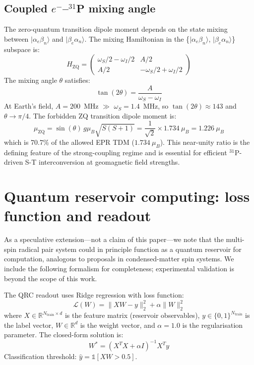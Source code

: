 \documentclass[11pt]{article}
\begin{document}
\subsection{Coupled $e^-$--$^{31}$P mixing angle}

The zero-quantum transition dipole moment depends on the state mixing between $|\alpha_e\beta_n\rangle$ and $|\beta_e\alpha_n\rangle$. The mixing Hamiltonian in the \{$|\alpha_e\beta_n\rangle$, $|\beta_e\alpha_n\rangle$\} subspace is:
\begin{equation}
H_\mathrm{ZQ} = \begin{pmatrix} \omega_S/2 - \omega_I/2 & A/2 \\ A/2 & -\omega_S/2 + \omega_I/2 \end{pmatrix}
\end{equation}
The mixing angle $\theta$ satisfies:
\begin{equation}
\tan(2\theta) = \frac{A}{\omega_S - \omega_I}
\end{equation}
At Earth's field, $A = 200$~MHz $\gg$ $\omega_S = 1.4$~MHz, so $\tan(2\theta) \approx 143$ and $\theta \rightarrow \pi/4$. The forbidden ZQ transition dipole moment is:
\begin{equation}
\mu_\mathrm{ZQ} = \sin(\theta)\,g\mu_B\sqrt{S(S+1)} = \frac{1}{\sqrt{2}} \times 1.734~\mu_B = 1.226~\mu_B
\end{equation}
which is 70.7\% of the allowed EPR TDM ($1.734~\mu_B$). This near-unity ratio is the defining feature of the strong-coupling regime and is essential for efficient $^{31}$P-driven S-T interconversion at geomagnetic field strengths.

\section{Quantum reservoir computing: loss function and readout}

As a speculative extension---not a claim of this paper---we note that the multi-spin radical pair system could in principle function as a quantum reservoir for computation, analogous to proposals in condensed-matter spin systems. We include the following formalism for completeness; experimental validation is beyond the scope of this work.

The QRC readout uses Ridge regression with loss function:
\begin{equation}
\mathcal{L}(W) = \|XW - y\|_2^2 + \alpha\|W\|_2^2
\label{eq:ridge}
\end{equation}
where $X \in \mathbb{R}^{N_\mathrm{train} \times d}$ is the feature matrix (reservoir observables), $y \in \{0,1\}^{N_\mathrm{train}}$ is the label vector, $W \in \mathbb{R}^d$ is the weight vector, and $\alpha = 1.0$ is the regularisation parameter. The closed-form solution is:
\begin{equation}
W^* = (X^T X + \alpha I)^{-1} X^T y
\end{equation}
Classification threshold: $\hat{y} = \mathbb{1}[XW > 0.5]$.
\end{document}
